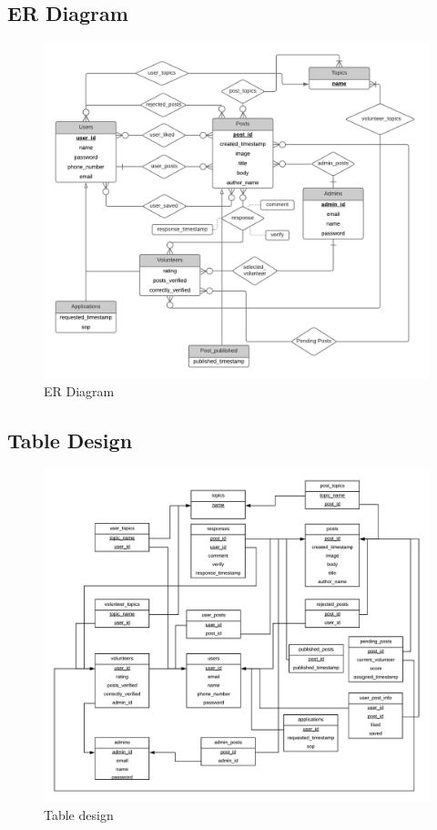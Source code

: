 \documentclass[titlepage,12pt]{article}
\begin{document}
\subsection{ER Diagram}
\begin{figure}[H]
    \centering
    \includegraphics[width=1.1\textwidth]{EntityRelationshipDiagram}
    \caption{ER Diagram}
    \label{fig:er_diagram}
\end{figure}
\newpage
\subsection{Table Design}
\begin{figure}[H]
    \centering
    \includegraphics[width=1.1\textwidth]{TableDesign.png}
    \caption{Table design}
    \label{fig:table_design}
\end{figure}
\end{document}
